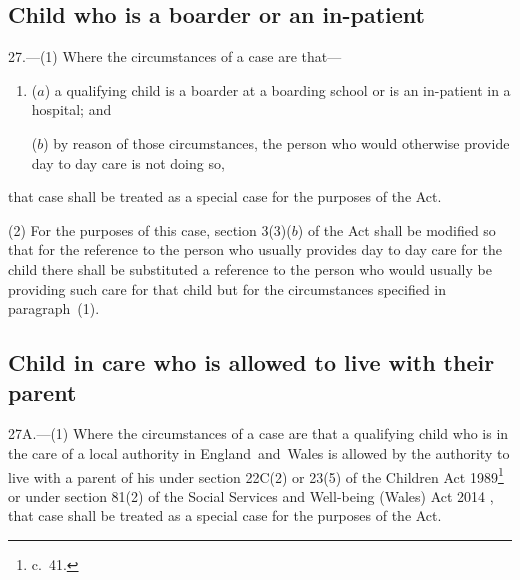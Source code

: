 \documentclass[12pt,a4paper]{article}
\begin{document}
\subsection[27. Child who is a boarder or an in-patient]{Child who is a boarder or an in-patient}

27.—(1) Where the circumstances of a case are that—
\begin{enumerate}\item[]
($a$) a qualifying child is a boarder at a boarding school or is an in-patient in a hospital; and

($b$) by reason of those circumstances, the person who would otherwise provide day to day care is not doing so,
\end{enumerate}
that case shall be treated as a special case for the purposes of the Act.

(2) For the purposes of this case, section 3(3)($b$) of the Act shall be modified so 
that %
for the reference to the person who usually provides day to day care for the child there shall be substituted a reference to the person who would usually be providing such care for that child but for the circumstances specified in paragraph~(1).


\subsection[27A. 
Child in care who is allowed to live with their parent%
]{%
Child in care who is allowed to live with their parent%
}

27A.—(1) Where the circumstances of a case are that a qualifying child who is in the care of a local authority in England~and~Wales is allowed by the authority to live with a parent of his under section 
22C(2) or  %
23(5) of the Children Act 1989\footnote{ c.~41.}
or under section 81(2) of the Social Services and Well-being (Wales) Act 2014%
, that case shall be treated as a special case for the purposes of the Act.%
\end{document}
